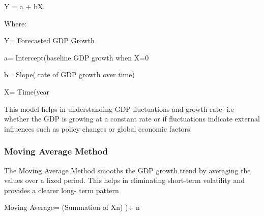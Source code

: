 \documentclass{article}
\begin{document}
\Large{Y = a + bX.}

\large{Where:}

\large{ 
Y= Forecasted GDP Growth

a= Intercept(baseline GDP growth when X=0

b= Slope( rate of GDP growth over time)

X= Time(year}


This model helps in understanding GDP fluctuations and growth rate- i.e whether the GDP is growing at a constant rate or if fluctuations indicate external influences such as policy changes or global economic factors.

\subsubsection{Moving Average Method}
The Moving Average Method smooths the GDP growth trend by averaging the values over a fixed period. This helps in eliminating short-term volatility and provides a clearer long- term pattern

\Large{Moving Average= (Summation of X\tiny{n}) \Large{)÷ n}}
\end{document}
